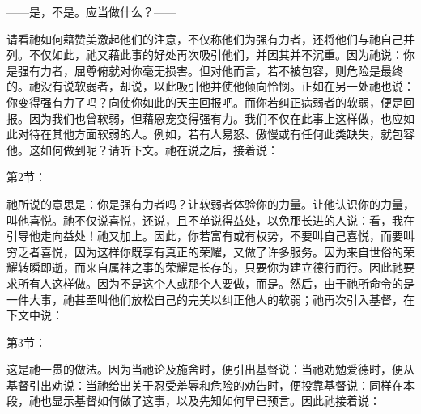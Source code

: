  ——是，不是。应当做什么？——\par

请看祂如何藉赞美激起他们的注意，不仅称他们为强有力者，还将他们与祂自己并列。不仅如此，祂又藉此事的好处再次吸引他们，并因其并不沉重。因为祂说：你是强有力者，屈尊俯就对你毫无损害。但对他而言，若不被包容，则危险是最终的。祂没有说软弱者，却说，以此吸引他并使他倾向怜悯。正如在另一处祂也说：你变得强有力了吗？向使你如此的天主回报吧。而你若纠正病弱者的软弱，便是回报。因为我们也曾软弱，但藉恩宠变得强有力。我们不仅在此事上这样做，也应如此对待在其他方面软弱的人。例如，若有人易怒、傲慢或有任何此类缺失，就包容他。这如何做到呢？请听下文。祂在说之后，接着说：\par

第2节：\par

祂所说的意思是：你是强有力者吗？让软弱者体验你的力量。让他认识你的力量，叫他喜悦。祂不仅说喜悦，还说，且不单说得益处，以免那长进的人说：看，我在引导他走向益处！祂又加上。因此，你若富有或有权势，不要叫自己喜悦，而要叫穷乏者喜悦，因为这样你既享有真正的荣耀，又做了许多服务。因为来自世俗的荣耀转瞬即逝，而来自属神之事的荣耀是长存的，只要你为建立德行而行。因此祂要求所有人这样做。因为不是这个人或那个人要做，而是。然后，由于祂所命令的是一件大事，祂甚至叫他们放松自己的完美以纠正他人的软弱；祂再次引入基督，在下文中说：\par

第3节：\par

这是祂一贯的做法。因为当祂论及施舍时，便引出基督说：当祂劝勉爱德时，便从基督引出劝说：当祂给出关于忍受羞辱和危险的劝告时，便投靠基督说：同样在本段，祂也显示基督如何做了这事，以及先知如何早已预言。因此祂接着说：\par

